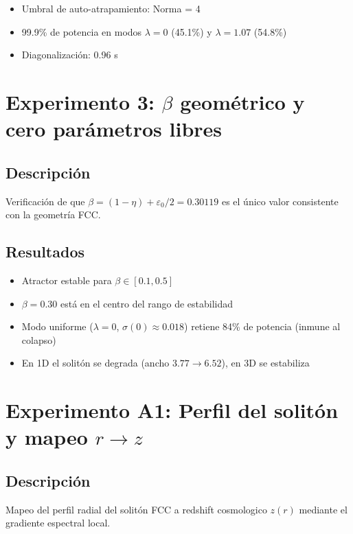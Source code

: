 \documentclass[12pt]{article}
\begin{document}
\begin{itemize}
  \item Umbral de auto-atrapamiento: Norma = 4
  \item 99.9\% de potencia en modos $\lambda=0$ (45.1\%) y $\lambda=1.07$ (54.8\%)
  \item Diagonalizaci\'on: 0.96 s
\end{itemize}

\section{Experimento 3: $\beta$ geom\'etrico y cero par\'ametros libres}

\subsection{Descripci\'on}
Verificaci\'on de que $\beta = (1-\eta) + \varepsilon_0/2 = 0.30119$ es el \'unico valor consistente con la geometr\'ia FCC.

\subsection{Resultados}
\begin{itemize}
  \item Atractor estable para $\beta \in [0.1, 0.5]$
  \item $\beta = 0.30$ est\'a en el centro del rango de estabilidad
  \item Modo uniforme ($\lambda=0$, $\sigma(0)\approx 0.018$) retiene 84\% de potencia (inmune al colapso)
  \item En 1D el solit\'on se degrada (ancho $3.77 \to 6.52$), en 3D se estabiliza
\end{itemize}

\section{Experimento A1: Perfil del solit\'on y mapeo $r\to z$}

\subsection{Descripci\'on}
Mapeo del perfil radial del solit\'on FCC a redshift cosmologico $z(r)$ mediante el gradiente espectral local.
\end{document}
